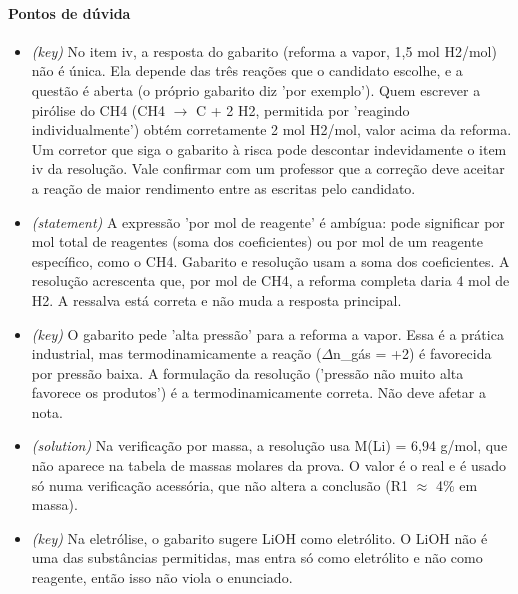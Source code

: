 \documentclass{article}%
\begin{document}
\paragraph{Pontos de dúvida}%
\begin{itemize}%
\item%
\textit{(key)} No item iv, a resposta do gabarito (reforma a vapor, 1,5 mol H2/mol) não é única. Ela depende das três reações que o candidato escolhe, e a questão é aberta (o próprio gabarito diz 'por exemplo'). Quem escrever a pirólise do CH4 (CH4 $\to$ C + 2 H2, permitida por 'reagindo individualmente') obtém corretamente 2 mol H2/mol, valor acima da reforma. Um corretor que siga o gabarito à risca pode descontar indevidamente o item iv da resolução. Vale confirmar com um professor que a correção deve aceitar a reação de maior rendimento entre as escritas pelo candidato.%
\item%
\textit{(statement)} A expressão 'por mol de reagente' é ambígua: pode significar por mol total de reagentes (soma dos coeficientes) ou por mol de um reagente específico, como o CH4. Gabarito e resolução usam a soma dos coeficientes. A resolução acrescenta que, por mol de CH4, a reforma completa daria 4 mol de H2. A ressalva está correta e não muda a resposta principal.%
\item%
\textit{(key)} O gabarito pede 'alta pressão' para a reforma a vapor. Essa é a prática industrial, mas termodinamicamente a reação ($\Delta$n\_gás = +2) é favorecida por pressão baixa. A formulação da resolução ('pressão não muito alta favorece os produtos') é a termodinamicamente correta. Não deve afetar a nota.%
\item%
\textit{(solution)} Na verificação por massa, a resolução usa M(Li) = 6,94 g/mol, que não aparece na tabela de massas molares da prova. O valor é o real e é usado só numa verificação acessória, que não altera a conclusão (R1 $\approx$ 4\% em massa).%
\item%
\textit{(key)} Na eletrólise, o gabarito sugere LiOH como eletrólito. O LiOH não é uma das substâncias permitidas, mas entra só como eletrólito e não como reagente, então isso não viola o enunciado.%
\end{itemize}%
\end{document}
